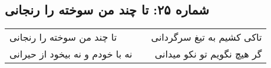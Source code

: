 \begin{center}
\section*{شماره ۲۵: تا چند من سوخته را رنجانی}
\label{sec:025}
\begin{longtable}{l p{0.5cm} r}
تا چند من سوخته را رنجانی
&&
تاکی کشیم به تیغ سرگردانی
\\
نه با خودم و نه بیخود از حیرانی
&&
گر هیچ نگویم تو نکو میدانی
\\
\end{longtable}
\end{center}
